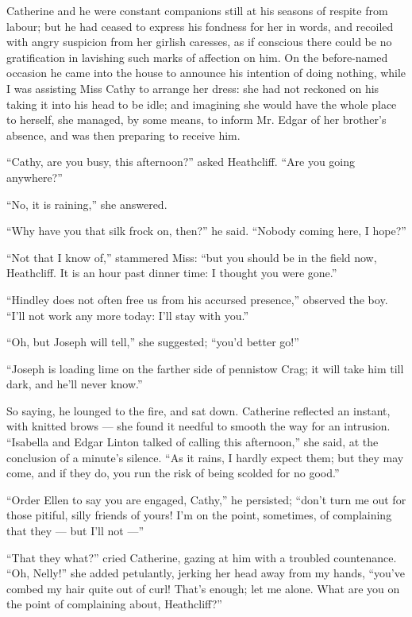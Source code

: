 \par Catherine and he were constant companions still at his seasons of respite from labour; but he had ceased to express his fondness for her in words, and recoiled with angry suspicion from her girlish caresses, as if conscious there could be no gratification in lavishing such marks of affection on him. On the before-named occasion he came into the house to announce his intention of doing nothing, while I was assisting Miss Cathy to arrange her dress: she had not reckoned on his taking it into his head to be idle; and imagining she would have the whole place to herself, she managed, by some means, to inform Mr. Edgar of her brother's absence, and was then preparing to receive him.
\par “Cathy, are you busy, this afternoon?” asked Heathcliff. “Are you going anywhere?”
\par “No, it is raining,” she answered.
\par “Why have you that silk frock on, then?” he said. “Nobody coming here, I hope?”
\par “Not that I know of,” stammered Miss: “but you should be in the field now, Heathcliff. It is an hour past dinner time: I thought you were gone.”
\par “Hindley does not often free us from his accursed presence,” observed the boy. “I'll not work any more today: I'll stay with you.”
\par “Oh, but Joseph will tell,” she suggested; “you'd better go!”
\par “Joseph is loading lime on the farther side of pennistow Crag; it will take him till dark, and he'll never know.”
\par So saying, he lounged to the fire, and sat down. Catherine reflected an instant, with knitted brows — she found it needful to smooth the way for an intrusion. “Isabella and Edgar Linton talked of calling this afternoon,” she said, at the conclusion of a minute's silence. “As it rains, I hardly expect them; but they may come, and if they do, you run the risk of being scolded for no good.”
\par “Order Ellen to say you are engaged, Cathy,” he persisted; “don't turn me out for those pitiful, silly friends of yours! I'm on the point, sometimes, of complaining that they — but I'll not —”
\par “That they what?” cried Catherine, gazing at him with a troubled countenance. “Oh, Nelly!” she added petulantly, jerking her head away from my hands, “you've combed my hair quite out of curl! That's enough; let me alone. What are you on the point of complaining about, Heathcliff?”
